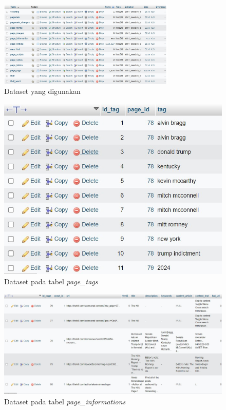 \begin{figure}[H]
  \centering
  \includegraphics[width=0.75\textwidth]{gambar/bab_4_image/dataset.jpg}
  \caption{Dataset yang digunakan}
  \label{gambar:dataset}
\end{figure}

\begin{figure}[H]
  \centering
  \includegraphics[width=1\textwidth]{gambar/bab_4_image/dataset tag.jpg}
  \caption{Dataset pada tabel \textit{page\_tags}}
  \label{gambar:datasetTag}
\end{figure}

\begin{figure}[H]
  \centering
  \includegraphics[width=1\textwidth]{gambar/bab_4_image/dataset article.jpg}
  \caption{Dataset pada tabel \textit{page\_informations}}
  \label{gambar:datasetInformation}
\end{figure}

